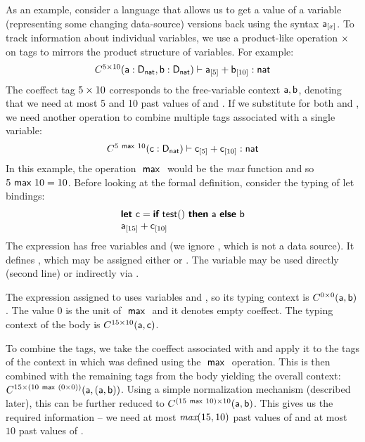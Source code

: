 As an example, consider a language that allows us to get a value of a variable (representing
some changing data-source)  versions back using the syntax $\textnormal{\sffamily a}_{[x]}$. 
To track information about individual variables, we use a product-like operation $\times$ on tags 
to mirrors the product structure of variables. For example:
%
\begin{equation*}
\begin{array}{l}
\ctyp{5 \cprd 10}{(\ident{a}:\dnat, \ident{b}:\dnat)}
  \vdash
    \pastval{a}{5}+\pastval{b}{10}: \ident{nat}
\end{array}
\end{equation*}
%
The coeffect tag $5 \times 10$ corresponds to the free-variable context $\textnormal{\sffamily a}, \textnormal{\sffamily b}$, denoting
that we need at most 5 and 10 past values of  and . If we substitute 
for both  and , we need another operation to combine multiple tags associated with 
a single variable:
%
\begin{equation*}
\begin{array}{l}
\ctyp{5 \cvop 10}{(\ident{c}:\dnat)}
  \vdash
    \pastval{c}{5}+\pastval{c}{10}: \ident{nat}
\end{array}
\end{equation*}
%
In this example, the operation $~\textnormal{\sffamily max}~$ would be the \emph{max} function and so $5 ~\textnormal{\sffamily max}~ 10 = 10$.
Before looking at the formal definition, consider the typing of let bindings:
%
\begin{equation*}
\begin{array}{l}
\kvd{let}~\ident{c} = \kvd{if}~\ident{test}()~\kvd{then}~\ident{a}~\kvd{else}~\ident{b}\\
\pastval{a}{15}+\pastval{c}{10}
\end{array}
\end{equation*}
%
The expression has free variables  and  (we ignore , which
is not a data source). It defines , which may be assigned either  or .
The variable  may be used directly (second line) or indirectly via .

The expression assigned to  uses variables  and , so its typing
context is $C^{0 \times 0}(\textnormal{\sffamily a}, \textnormal{\sffamily b})$. The value $0$ is the unit
of $~\textnormal{\sffamily max}~$ and it denotes empty coeffect. The typing context of the
body is $C^{15 \times 10}(\textnormal{\sffamily a}, \textnormal{\sffamily c})$.

To combine the tags, we take the coeffect associated with  and apply it to the tags
of the context in which  was defined using the $~\textnormal{\sffamily max}~$ operation. This is then combined 
with the remaining tags from the body yielding the overall context:
$C^{15 \times (10 ~\textnormal{\sffamily max}~ (0 \times 0))}(\textnormal{\sffamily a}, (\textnormal{\sffamily a}, \textnormal{\sffamily b}))$. Using a simple
normalization mechanism (described later), this can be further reduced to
$C^{(15 ~\textnormal{\sffamily max}~ 10) \times 10}(\textnormal{\sffamily a}, \textnormal{\sffamily b})$. This gives us the required information --
we need at most $\emph{max}(15,10)$ past values of  and at most $10$ past values of 
.

